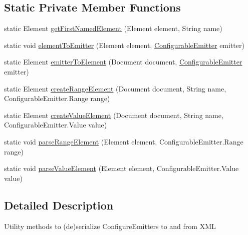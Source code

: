 \subsection*{Static Private Member Functions}
\begin{DoxyCompactItemize}
\item 
static Element \mbox{\hyperlink{classorg_1_1newdawn_1_1slick_1_1particles_1_1_particle_i_o_a84405f6266ad1512ddbd9939dd73e02f}{get\+First\+Named\+Element}} (Element element, String name)
\item 
static void \mbox{\hyperlink{classorg_1_1newdawn_1_1slick_1_1particles_1_1_particle_i_o_a0f9a2d655a230395efcb645a520cf988}{element\+To\+Emitter}} (Element element, \mbox{\hyperlink{classorg_1_1newdawn_1_1slick_1_1particles_1_1_configurable_emitter}{Configurable\+Emitter}} emitter)
\item 
static Element \mbox{\hyperlink{classorg_1_1newdawn_1_1slick_1_1particles_1_1_particle_i_o_af9519582cb522c103cc0a829fb3e8413}{emitter\+To\+Element}} (Document document, \mbox{\hyperlink{classorg_1_1newdawn_1_1slick_1_1particles_1_1_configurable_emitter}{Configurable\+Emitter}} emitter)
\item 
static Element \mbox{\hyperlink{classorg_1_1newdawn_1_1slick_1_1particles_1_1_particle_i_o_a9c35ea6edbfd626b65a23b87517c323d}{create\+Range\+Element}} (Document document, String name, Configurable\+Emitter.\+Range range)
\item 
static Element \mbox{\hyperlink{classorg_1_1newdawn_1_1slick_1_1particles_1_1_particle_i_o_ad9f392331cc84467398b6ac9c41a1d7b}{create\+Value\+Element}} (Document document, String name, Configurable\+Emitter.\+Value value)
\item 
static void \mbox{\hyperlink{classorg_1_1newdawn_1_1slick_1_1particles_1_1_particle_i_o_a99f79efdbfa98c3d6c2fff816ed9c312}{parse\+Range\+Element}} (Element element, Configurable\+Emitter.\+Range range)
\item 
static void \mbox{\hyperlink{classorg_1_1newdawn_1_1slick_1_1particles_1_1_particle_i_o_a82b077f0d91ea3410e75e03e1d559a6b}{parse\+Value\+Element}} (Element element, Configurable\+Emitter.\+Value value)
\end{DoxyCompactItemize}


\subsection{Detailed Description}
Utility methods to (de)serialize Configure\+Emitters to and from X\+ML

